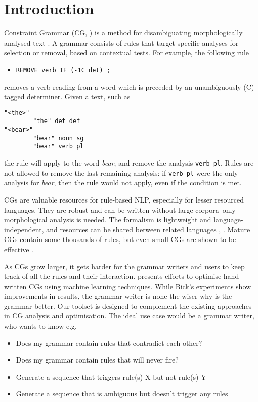 \section{Introduction}
\label{sec:intro}

Constraint Grammar (CG, \cite{karlsson1995constraint})
is a method for disambiguating morphologically analysed text%
. 
A grammar consists of rules that target specific analyses for selection or removal, based on contextual tests. For example, the following rule
\begin{itemize}
\item[] \texttt{REMOVE verb IF (-1C det) ;}
\end{itemize}
removes a verb reading from a word which is preceded by an unambiguously (C) tagged determiner.
Given a text, such as

\begin{verbatim}
"<the>"
        "the" det def
"<bear>"
        "bear" noun sg
        "bear" verb pl
\end{verbatim}

the rule will apply to the word \emph{bear}, and remove the analysis \texttt{verb pl}.
Rules are not allowed to remove the last remaining analysis: if  \texttt{verb pl} were the only analysis for \emph{bear}, then the rule would not apply, even if the condition is met.

CGs are valuable resources for rule-based NLP, especially for lesser resourced languages. They are robust and can be written without large corpora--only morphological analysis is needed. The formalism is lightweight and language-independent, and resources can be shared between related languages \cite{bick2006spanish}, \cite{lene_trond_linda2010}.
Mature CGs contain some thousands of rules, but even small CGs are shown to be effective \cite{lene_trond2011}.

As CGs grow larger, it gets harder for the grammar writers and users to keep track of all the rules and their interaction.
\cite{bick2013tuning} presents efforts to optimise hand-written CGs using machine learning techniques.
While Bick's experiments show improvements in results, the grammar writer is none the wiser why is the grammar better.
Our toolset is designed to complement the existing approaches in CG analysis and optimisation.
The ideal use case would be a grammar writer, who wants to know e.g.

\begin{itemize}
\item Does my grammar contain rules that contradict each other?
\item Does my grammar contain rules that will never fire?
\item Generate a sequence that triggers rule(s) X but not rule(s) Y
\item Generate a sequence that is ambiguous but doesn't trigger any rules
\end{itemize}

